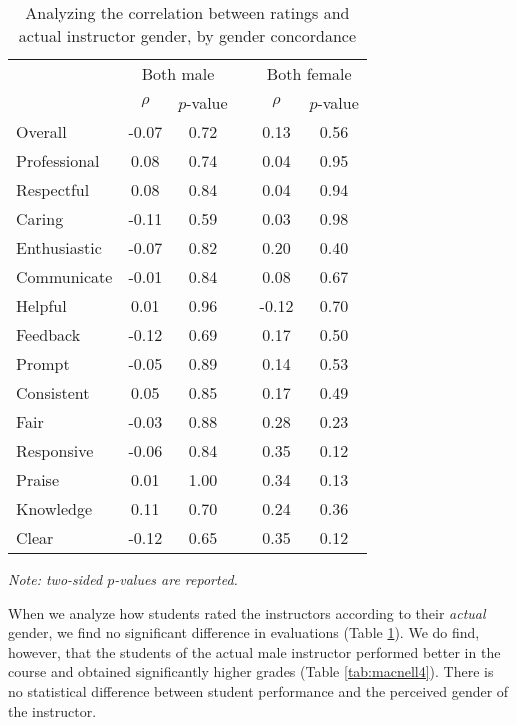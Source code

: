 \documentclass[12pt]{article}
\begin{document}
\begin{table}[htbp]
  \centering
  \footnotesize 
  \caption{Analyzing the correlation between ratings and actual instructor gender, by gender concordance}
    \begin{tabular}{lccccc}
    \toprule 
          & \multicolumn{2}{c}{Both male}  &  & \multicolumn{2}{c}{Both female} \\
                          & $\rho$  &  $p$-value &  & $\rho$  &  $p$-value    \\
                          
   \midrule
    Overall &                -0.07       & 0.72 & &  0.13    & 0.56   \\
    Professional &            0.08       & 0.74 & &  0.04    & 0.95   \\
    Respectful		       &  0.08       & 0.84 & &  0.04    & 0.94   \\
    Caring &                 -0.11       & 0.59 & &  0.03    & 0.98  \\
    Enthusiastic   &         -0.07       & 0.82 & &  0.20    & 0.40   \\
    Communicate        &     -0.01       & 0.84 & &  0.08    & 0.67  \\
    Helpful   &               0.01       & 0.96 & & -0.12    & 0.70   \\
    Feedback   &             -0.12       & 0.69 & &  0.17    & 0.50   \\
    Prompt    &              -0.05       & 0.89 & &  0.14    & 0.53   \\
    Consistent   &            0.05       & 0.85 & &  0.17    & 0.49   \\
    Fair   &                 -0.03       & 0.88 & &  0.28    & 0.23  \\
    Responsive   &           -0.06       & 0.84 & &  0.35    & 0.12  \\
    Praise   &                0.01       & 1.00 & &  0.34    & 0.13  \\
    Knowledge   &             0.11       & 0.70 & &  0.24    & 0.36  \\
    Clear   &                -0.12       & 0.65 & &  0.35    & 0.12  \\
    \bottomrule
    \end{tabular}%
 \label{tab:macnell3}%

  \textit{Note: two-sided $p$-values are reported.}  
\end{table}%
\normalsize

When we analyze how students rated the instructors according to their \textit{actual} gender, we find no significant difference in evaluations (Table \ref{tab:macnell3}). We do find, however, that the students of the actual male instructor performed better in the course and obtained significantly higher grades (Table \ref{tab:macnell4}). There is no statistical difference between student performance and the perceived gender of the instructor. 
\end{document}
